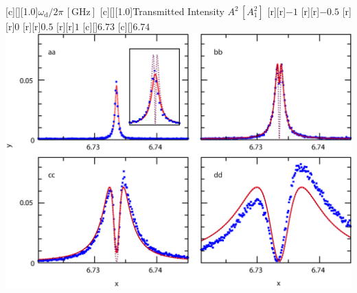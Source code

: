 

 \figstyle
 [c][][1.0]{$\omega_\text{d}/2\pi\,[\text{GHz}]$}
 [c][][1.0]{Transmitted Intensity $A^2\,[A_1^2]$}
 [r][r]{\figsmallest$-1$}
 [r][r]{\figsmallest$-0.5$}
 [r][r]{\figsmallest$0$}
 [r][r]{\figsmallest$0.5$}
 [r][r]{\figsmallest$1$}
 [c][]{\figsmallest$6.73$}
 [c][]{\figsmallest$6.74$}
 \includegraphics[height=\bigheight]{linecuts4pan}

